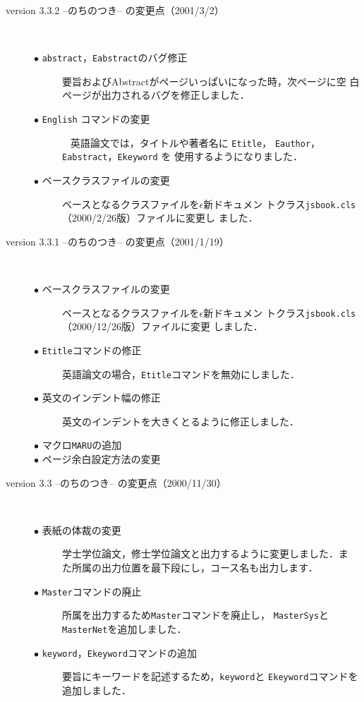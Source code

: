 \documentclass[mingoth]{kut-paper}		%
\begin{document}
\begin{description}
 \item[version 3.3.2 --のちのつき-- の変更点（2001/3/2）]~
 \begin{description}
  \item[$\bullet$ \texttt{abstract}，\texttt{Eabstract}のバグ修正]
			 要旨およびAbstractがページいっぱいになった時，次ページに空
			 白ページが出力されるバグを修正しました．
  \item[$\bullet$ \texttt{English} コマンドの変更]~
			 英語論文では，タイトルや著者名に \texttt{Etitle}，
			 \texttt{Eauthor}，\texttt{Eabstract}，\texttt{Ekeyword} を
			 使用するようになりました．
  \item[$\bullet$ ベースクラスファイルの変更]
			 ベースとなるクラスファイルを$\epsilon$新ドキュメン
			 トクラス\texttt{jsbook.cls}（2000/2/26版）ファイルに変更し
			 ました．
 \end{description}
			
 \item[version 3.3.1 --のちのつき-- の変更点（2001/1/19）]~
 \begin{description}
  \item[$\bullet$ ベースクラスファイルの変更]
			 ベースとなるクラスファイルを$\epsilon$新ドキュメン
			 トクラス\texttt{jsbook.cls}（2000/12/26版）ファイルに変更
			 しました．
  \item[$\bullet$ \texttt{Etitle}コマンドの修正]
			 英語論文の場合，\texttt{Etitle}コマンドを無効にしました．		
  \item[$\bullet$ 英文のインデント幅の修正]
			 英文のインデントを大きくとるように修正しました．
  \item[$\bullet$ マクロ\texttt{MARU}の追加]
  \item[$\bullet$ ページ余白設定方法の変更]
 \end{description}

 \item[version 3.3 --のちのつき-- の変更点（2000/11/30）]~
 \begin{description}
  \item[$\bullet$ 表紙の体裁の変更]
			 学士学位論文，修士学位論文と出力するように変更しました．ま
			 た所属の出力位置を最下段にし，コース名も出力します．
  \item[$\bullet$ \texttt{Master}コマンドの廃止]
			 所属を出力するため\texttt{Master}コマンドを廃止し，
			 \texttt{MasterSys}と\texttt{MasterNet}を追加しました．
  \item[$\bullet$ \texttt{keyword}，\texttt{Ekeyword}コマンドの追加]
			 要旨にキーワードを記述するため，\texttt{keyword}と
			 \texttt{Ekeyword}コマンドを追加しました．
 \end{description}


\end{description}
\end{document}
